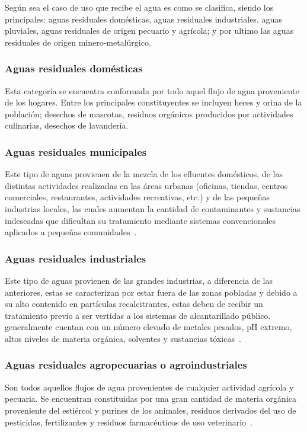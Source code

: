 Según sea el caso de uso que recibe el agua es como se clasifica, siendo los principales: aguas residuales domésticas, aguas residuales industriales, aguas pluviales, aguas residuales de origen pecuario y agrícola; y por ultimo las aguas residuales de origen minero-metalúrgico.\par
\subsubsection*{Aguas residuales domésticas}
Esta categoría se encuentra conformada por todo aquel flujo de agua proveniente de los hogares. Entre los principales constituyentes se incluyen heces y orina de la población; desechos de mascotas, residuos orgánicos producidos por actividades culinarias, desechos de lavandería.
\subsubsection*{Aguas residuales municipales}
Este tipo de aguas provienen de la mezcla de los \glspl{efluente} domésticos, de las distintas actividades realizadas en las áreas urbanas (oficinas, tiendas, centros comerciales, restaurantes, actividades recreativas, etc.) y de las pequeñas industrias locales, las cuales aumentan la cantidad de contaminantes y sustancias indeseadas que dificultan su tratamiento mediante sistemas convencionales aplicados a pequeñas comunidades~\citep{lazcano2016}.
\subsubsection*{Aguas residuales industriales}
Este tipo de aguas provienen de las grandes industrias, a diferencia de las anteriores, estas se caracterizan por estar fuera de las zonas pobladas y debido a su alto contenido en partículas recalcitrantes, estas deben de recibir un tratamiento previo a ser vertidas a los sistemas de alcantarillado público. generalmente cuentan con un número elevado de metales pesados, pH extremo, altos niveles de materia orgánica, solventes y sustancias tóxicas~\citep{lazcano2016}.
\subsubsection*{Aguas residuales agropecuarias o agroindustriales}
Son todos aquellos flujos de agua provenientes de cualquier actividad agrícola y pecuaria. Se encuentran constituidas por una gran cantidad de materia orgánica proveniente del estiércol y purines de los animales, residuos derivados del uso de pesticidas, fertilizantes y residuos farmacéuticos de uso veterinario~\citep{lazcano2016}.
